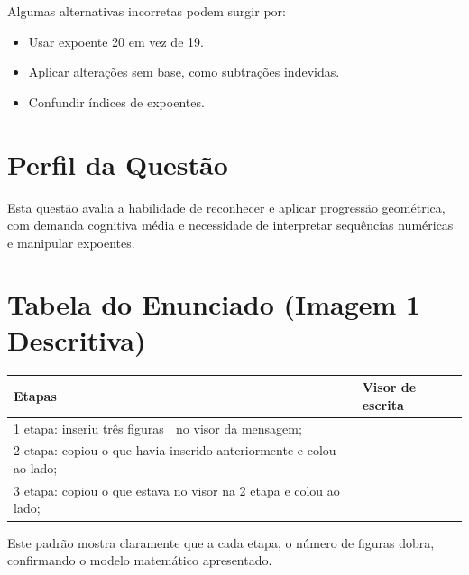 \documentclass{article}
\begin{document}
Algumas alternativas incorretas podem surgir por:

\begin{itemize}
  \item Usar expoente 20 em vez de 19.
  \item Aplicar alterações sem base, como subtrações indevidas.
  \item Confundir índices de expoentes.
\end{itemize}

\section*{Perfil da Questão}

Esta questão avalia a habilidade de reconhecer e aplicar progressão geométrica, com demanda cognitiva média e necessidade de interpretar sequências numéricas e manipular expoentes.

\section*{Tabela do Enunciado (Imagem 1 Descritiva)}

\begin{tabular}{|p{7cm}|p{7cm}|}
\hline
\textbf{Etapas} & \textbf{Visor de escrita} \\
\hline
1\textordfeminine{} etapa: inseriu três figuras 🙂 no visor da mensagem; & 🙂 🙂 🙂 \\
\hline
2\textordfeminine{} etapa: copiou o que havia inserido anteriormente e colou ao lado; & 🙂 🙂 🙂 🙂 🙂 🙂 \\
\hline
3\textordfeminine{} etapa: copiou o que estava no visor na 2\textordfeminine{} etapa e colou ao lado; & 🙂 🙂 🙂 🙂 🙂 🙂 🙂 🙂 🙂 🙂 🙂 🙂 \\
\hline
\end{tabular}

\bigskip

Este padrão mostra claramente que a cada etapa, o número de figuras dobra, confirmando o modelo matemático apresentado.
\end{document}
